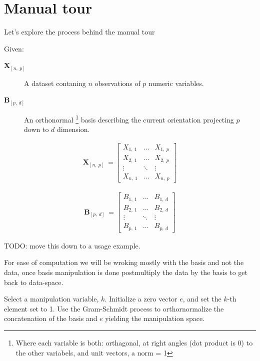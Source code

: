 \documentclass{monashthesis}
\begin{document}
\section{Manual tour}\label{manual-tour}

Let's explore the process behind the manual tour

Given:

\begin{description}
  \item[$\textbf{X}_{[n,~p]}$] A dataset contaning $n$ observations of $p$ numeric variables. 
  \item[$\textbf{B}_{[p,~d]}$] An orthonormal \footnote{Where each variable is both: orthagonal, at right angles (dot product is 0) to the other variabels, and unit vectors, a norm = 1} basis describing the current orientation projecting $p$ down to $d$ dimension.
\end{description}

\begin{align*}
  \textbf{X}_{[n,~p]} ~=
  \begin{bmatrix}
    X_{1,~1} & \dots  & X_{1,~p} \\
    X_{2,~1} & \dots  & X_{2,~p} \\
    \vdots   & \ddots & \vdots   \\
    X_{n,~1} & \dots  & X_{n,~p}
  \end{bmatrix}
\end{align*}

\begin{align*}
  \textbf{B}_{[p,~d]} ~=
  \begin{bmatrix}
    B_{1,~1} & \dots  & B_{1,~d} \\
    B_{2,~1} & \dots  & B_{2,~d} \\
    \vdots   & \ddots & \vdots   \\
    B_{p,~1} & \dots  & B_{p,~d}
  \end{bmatrix}
\end{align*}

TODO: move this down to a usage example.

For ease of computation we will be wroking mostly with the basis and not
the data, once basis manipulation is done postmultiply the data by the
basis to get back to data-space.

Select a manipulation variable, \(k\). Initialize a zero vector \(e\),
and set the \(k\)-th element set to 1. Use the Gram-Schmidt process to
orthornormalize the concatenation of the basis and \(e\) yielding the
manipulation space.
\end{document}
